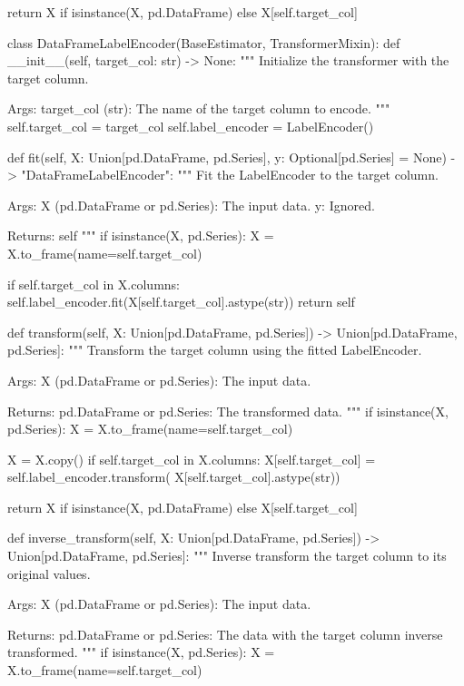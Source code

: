 {{        return X if isinstance(X, pd.DataFrame) else X[self.target_col]


class DataFrameLabelEncoder(BaseEstimator, TransformerMixin):
    def __init__(self, target_col: str) -> None:
        """
        Initialize the transformer with the target column.

        Args:
            target_col (str): The name of the target column to encode.
        """
        self.target_col = target_col
        self.label_encoder = LabelEncoder()

    def fit(self, X: Union[pd.DataFrame, pd.Series], y: Optional[pd.Series] = None) -> "DataFrameLabelEncoder":
        """
        Fit the LabelEncoder to the target column.

        Args:
            X (pd.DataFrame or pd.Series): The input data.
            y: Ignored.

        Returns:
            self
        """
        if isinstance(X, pd.Series):
            X = X.to_frame(name=self.target_col)

        if self.target_col in X.columns:
            self.label_encoder.fit(X[self.target_col].astype(str))
        return self

    def transform(self, X: Union[pd.DataFrame, pd.Series]) -> Union[pd.DataFrame, pd.Series]:
        """
        Transform the target column using the fitted LabelEncoder.

        Args:
            X (pd.DataFrame or pd.Series): The input data.

        Returns:
            pd.DataFrame or pd.Series: The transformed data.
        """
        if isinstance(X, pd.Series):
            X = X.to_frame(name=self.target_col)

        X = X.copy()
        if self.target_col in X.columns:
            X[self.target_col] = self.label_encoder.transform(
                X[self.target_col].astype(str))

        return X if isinstance(X, pd.DataFrame) else X[self.target_col]

    def inverse_transform(self, X: Union[pd.DataFrame, pd.Series]) -> Union[pd.DataFrame, pd.Series]:
        """
        Inverse transform the target column to its original values.

        Args:
            X (pd.DataFrame or pd.Series): The input data.

        Returns:
            pd.DataFrame or pd.Series: The data with the target column inverse transformed.
        """
        if isinstance(X, pd.Series):
            X = X.to_frame(name=self.target_col)

}}
